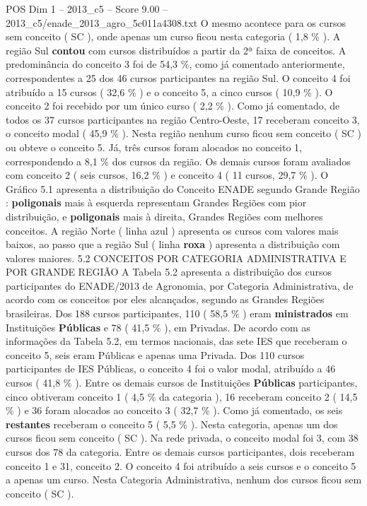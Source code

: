 \begin{textsample}{POS Dim 1 – 2013\_c5 – Score 9.00 – 2013\_c5/enade\_2013\_agro\_5c011a4308.txt}
O mesmo acontece para os cursos sem conceito ( SC ), onde apenas um curso ficou nesta categoria ( 1,8 \% ).
A região Sul \textbf{contou} com cursos distribuídos a partir da 2ª faixa de conceitos.
A predominância do conceito 3 foi de 54,3 \%, como já comentado anteriormente, correspondentes a 25 dos 46 cursos participantes na região Sul.
O conceito 4 foi atribuído a 15 cursos ( 32,6 \% ) e o conceito 5, a cinco cursos ( 10,9 \% ).
O conceito 2 foi recebido por um único curso ( 2,2 \% ).
Como já comentado, de todos os 37 cursos participantes na região Centro-Oeste, 17 receberam conceito 3, o conceito modal ( 45,9 \% ).
Nesta região nenhum curso ficou sem conceito ( SC ) ou obteve o conceito 5.
Já, três cursos foram alocados no conceito 1, correspondendo a 8,1 \% dos cursos da região.
Os demais cursos foram avaliados com conceito 2 ( seis cursos, 16,2 \% ) e conceito 4 ( 11 cursos, 29,7 \% ).
O Gráfico 5.1 apresenta a distribuição do Conceito ENADE segundo Grande Região : \textbf{poligonais} mais à esquerda representam Grandes Regiões com pior distribuição, e \textbf{poligonais} mais à direita, Grandes Regiões com melhores conceitos.
A região Norte ( linha azul ) apresenta os cursos com valores mais baixos, ao passo que a região Sul ( linha \textbf{roxa} ) apresenta a distribuição com valores maiores. 5.2 CONCEITOS POR CATEGORIA ADMINISTRATIVA E POR GRANDE REGIÃO A Tabela 5.2 apresenta a distribuição dos cursos participantes do ENADE/2013 de Agronomia, por Categoria Administrativa, de acordo com os conceitos por eles alcançados, segundo as Grandes Regiões brasileiras.
Dos 188 cursos participantes, 110 ( 58,5 \% ) eram \textbf{ministrados} em Instituições \textbf{Públicas} e 78 ( 41,5 \% ), em Privadas.
De acordo com as informações da Tabela 5.2, em termos nacionais, das sete IES que receberam o conceito 5, seis eram Públicas e apenas uma Privada.
Dos 110 cursos participantes de IES Públicas, o conceito 4 foi o valor modal, atribuído a 46 cursos ( 41,8 \% ).
Entre os demais cursos de Instituições \textbf{Públicas} participantes, cinco obtiveram conceito 1 ( 4,5 \% da categoria ), 16 receberam conceito 2 ( 14,5 \% ) e 36 foram alocados ao conceito 3 ( 32,7 \% ).
Como já comentado, os seis \textbf{restantes} receberam o conceito 5 ( 5,5 \% ).
Nesta categoria, apenas um dos cursos ficou sem conceito ( SC ).
Na rede privada, o conceito modal foi 3, com 38 cursos dos 78 da categoria.
Entre os demais cursos participantes, dois receberam conceito 1 e 31, conceito 2.
O conceito 4 foi atribuído a seis cursos e o conceito 5 a apenas um curso.
Nesta Categoria Administrativa, nenhum dos cursos ficou sem conceito ( SC ).

\end{textsample}
